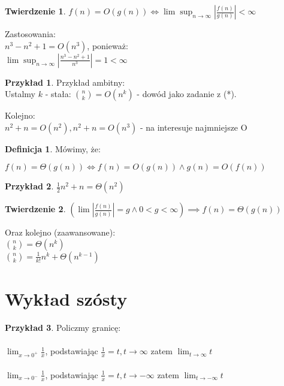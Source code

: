 \documentclass{article}
\theoremstyle{definition}
\newtheorem{de}{Definicja}[subsection]
\theoremstyle{definition}
\newtheorem{tw}{Twierdzenie}[subsection]
\theoremstyle{definition}
\newtheorem{pk}{Przykład}[subsection]
\theoremstyle{definition}
\begin{document}
\begin{tw}
    $f(n) = O(g(n)) \iff \lim \sup_{n\rightarrow \infty} \left|\frac{f(n)}{g(n)}\right|<\infty$
\end{tw}
Zastosowania:\\
$n^3-n^2+1=O(n^3)$, ponieważ:\\
$\lim \sup_{n\rightarrow \infty} \left|\frac{n^3-n^2+1}{n^3}\right|=1<\infty$

\begin{pk}
    Przykład ambitny:\\
    Ustalmy $k$ - stała:
    $\binom{n}{k}=O(n^k)$ - dowód jako zadanie z (*).
\end{pk}

Kolejno:\\
$n^2+n=O(n^2), n^2+n=O(n^3)$ - na interesuje najmniejsze O

\begin{de}
    Mówimy, że:
    \begin{center}
        $f(n) = \Theta(g(n))\iff f(n)=O(g(n)) \land g(n)=O(f(n))$
    \end{center}
\end{de}

\begin{pk}
    $\frac{1}{2} n^2 + n = \Theta(n^2)$
\end{pk}

\begin{tw}
$\left(\lim \left|\frac{f(n)}{g(n)}\right|=g \land 0<g<\infty \right)\implies f(n)=\Theta(g(n))$
\end{tw}

Oraz kolejno (zaawansowane):\\
$\binom{n}{k}=\Theta (n^k)$\\
$\binom{n}{k}=\frac{1}{k!} n^k + \Theta(n^{k-1})$

\section{Wykład szósty}

\begin{pk}
    Policzmy granicę:\\\\
    $\lim_{x\rightarrow 0^+} \frac{1}{x}$, podstawiając $\frac{1}{x}=t, t\rightarrow\infty$ zatem $\lim_{t\rightarrow \infty} t $\\\\
    $\lim_{x\rightarrow 0^-} \frac{1}{x}$, podstawiając $\frac{1}{x}=t, t\rightarrow -\infty$ zatem $\lim_{t\rightarrow -\infty} t $
\end{pk}
\end{document}
